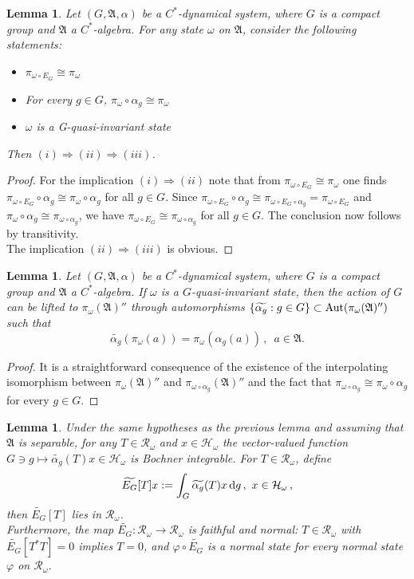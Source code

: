 \documentclass[12pt]{amsart}
\numberwithin{equation}{section}
\def\ch{{\mathcal H}}
\def\ga{{\mathfrak A}} \def\gpa{{\mathfrak a}}
\def\a{\alpha}
\def\om{\omega} \def\Om{\Omega}
\newtheorem{lem}[thm]{Lemma}
\theoremstyle{definition}
\begin{document}
\begin{lem}
\label{lem:impl}
Let $(G, \ga, \alpha)$ be a $C^*$-dynamical system, where $G$ is a compact group and
$\ga$ a $C^*$-algebra. For any state $\om$ on $\ga$, consider the following
statements:
\begin{itemize}
\item[(i)] $\pi_{\om\circ E_G}\cong \pi_\om$
\item[(ii)] For every $g\in G$, $\pi_\om\circ \a_g\cong \pi_\om$
\item[(iii)] $\om$ is a G-quasi-invariant state
\end{itemize}
Then $(i)\Rightarrow (ii)\Rightarrow (iii)$.
\end{lem}

\begin{proof}
For the implication  $(i)\Rightarrow (ii)$  note that from  $\pi_{\om\circ E_G}\cong \pi_\om$ one finds
$\pi_{\om\circ E_G}\circ \a_g\cong \pi_\om\circ \a_g$ for all $g\in G$. Since
$\pi_{\om\circ E_G}\circ \a_g\cong \pi_{\om\circ E_G\circ \a_g}=\pi_{\om\circ E_G}$ and $\pi_\om\circ \a_g\cong
\pi_{\om\circ \a_g}$, we have $\pi_{\om\circ E_G}\cong \pi_{\om\circ \a_g}$ for all $g\in G$. The conclusion now follows by transitivity.\\
The implication  $(ii)\Rightarrow (iii)$ is obvious.

\end{proof}

\begin{lem}
\label{lem:extension}
Let $(G, \ga, \alpha)$ be a $C^*$-dynamical system, where $G$ is a compact group and
$\ga$ a $C^*$-algebra. If $\om$ is a $G$-quasi-invariant state, then the action of $G$
can be lifted to  $\pi_\om(\ga)''$ through automorphisms $\{\widetilde{\a_g}: g\in G\}\subset {\rm Aut}(\pi_\om(\ga)'')$ such that 
$$\widetilde{\a_g}(\pi_\om(a))=\pi_\om(\a_g(a))\,,\,\,\,a\in \ga.$$
\end{lem}


\begin{proof}
It is a straightforward consequence of the existence of the interpolating isomorphism between 
$\pi_\om(\ga)''$ and $\pi_{\om\circ\a_g}(\ga)''$
and the fact that  $\pi_{\om\circ\a_g}\cong \pi_\om\circ\alpha_g$ for
every $g\in G$.
\end{proof}


\begin{lem}
\label{lem:exp}
Under the same hypotheses as the previous lemma and assuming that $\ga$ is separable, for any
$T\in\mathcal{R}_\om$ and $x\in\ch_\om$ the vector-valued function
$G\ni g\mapsto \widetilde{\a_g}(T)x\in \ch_\om$ is Bochner
integrable. For $T\in\mathcal{R}_\om$, define
$$\widetilde {E_G}[T]x:=\int_G \widetilde{\a_g}(T)x\,{\rm d}g\,, \,\, x\in\ch_\om\,, $$
then $\widetilde{E_G}[T]$ lies in $\mathcal{R}_\om$. \\
Furthermore, the map
$\widetilde{E_G}:\mathcal{R}_\om\rightarrow\mathcal{R}_\om$ is
faithful and normal: $T\in\mathcal{R}_\om$ with $\widetilde {E_G}[T^*T]=0$ implies $T=0$, and
$\varphi\circ\widetilde {E_G}$ is a normal state for every normal state $\varphi$ on $\mathcal{R}_\om$.
\end{lem}
\end{document}
